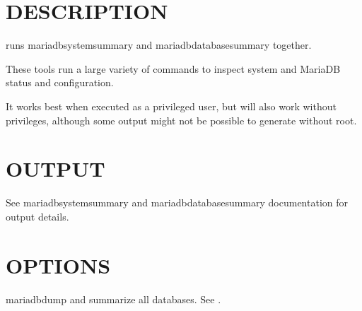 \documentclass[letterpaper,10pt,english]{sphinxmanual}
\begin{document}
\section{DESCRIPTION}
\label{\detokenize{mariadb-summary:description}}
 runs mariadb\sphinxhyphen{}system\sphinxhyphen{}summary and mariadb\sphinxhyphen{}database\sphinxhyphen{}summary together.

These tools run a large variety of commands to inspect system and MariaDB
status and configuration.

It works best when executed as a privileged user, but will also work without
privileges, although some output might not be possible to generate without root.


\section{OUTPUT}
\label{\detokenize{mariadb-summary:output}}
See mariadb\sphinxhyphen{}system\sphinxhyphen{}summary and mariadb\sphinxhyphen{}database\sphinxhyphen{}summary documentation for output
details.


\section{OPTIONS}
\label{\detokenize{mariadb-summary:options}}

\begin{fulllineitems}
\label{\detokenize{mariadb-summary:cmdoption-mariadb-summary-all-databases}}
mariadb\sphinxhyphen{}dump and summarize all databases.  See {\hyperref[\detokenize{mariadb-summary:cmdoption-mariadb-summary-databases}]{}}.

\end{fulllineitems}
\end{document}
